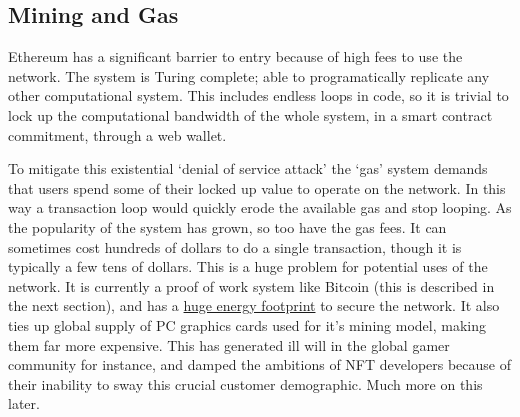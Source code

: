 \subsection{Mining and Gas}
Ethereum has a significant barrier to entry because of high fees to use the network. The system is Turing complete; able to programatically replicate any other computational system. This includes endless loops in code, so it is trivial to lock up the computational bandwidth of the whole system, in a smart contract commitment, through a web wallet. \par 
To mitigate this existential `denial of service attack' the `gas' system demands that users spend some of their locked up value to operate on the network. In this way a transaction loop would quickly erode the available gas and stop looping. As the popularity of the system has grown, so too have the gas fees. It can sometimes cost hundreds of dollars to do a single transaction, though it is typically a few tens of dollars. This is a huge problem for potential uses of the network. It is currently a proof of work system like Bitcoin (this is described in the next section), and has a \href{https://news.trust.org/packages/cryptocurrency-and-climate/}{huge energy footprint} to secure the network. It also ties up global supply of PC graphics cards used for it's mining model, making them far more expensive. This has generated ill will in the global gamer community for instance, and damped the ambitions of NFT developers because of their inability to sway this crucial customer demographic. Much more on this later.\par
